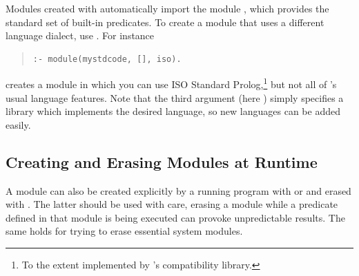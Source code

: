 Modules created with 
automatically import the module
,  which provides the standard
set of {\eclipse} built-in predicates.
To create a module that uses a different language dialect, use
.
For instance
\begin{quote}
\begin{verbatim}
:- module(mystdcode, [], iso).
\end{verbatim}
\end{quote}
creates a module in which you can use ISO Standard Prolog,\footnote{%
  To the extent implemented by {\eclipse}'s compatibility library.}
but not all of {\eclipse}'s usual language features.
Note that the third argument (here ) simply
specifies a library which implements the desired language,
so new languages can be added easily.


\subsection{Creating and Erasing Modules at Runtime}
\begin{sloppypar}
A module can also be created explicitly by a running program with
 or
and erased with
.
The latter should be used with care, erasing a module while a
predicate defined in that module is being executed can provoke
unpredictable results. The same holds for trying to erase essential
system modules.
\end{sloppypar}


